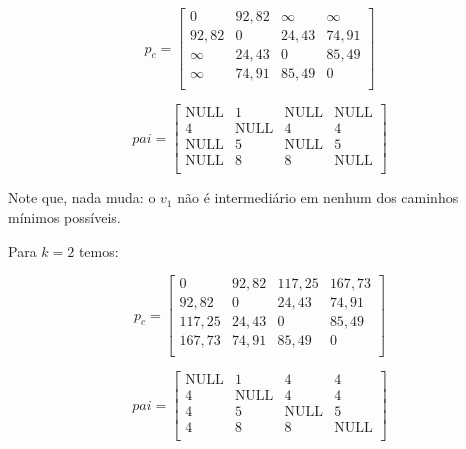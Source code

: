 \begin{equation}
	p_c = 
	\begin{bmatrix} \label{eq:matrizCustoFloydWarshall-2}
		0 & 92,82 & \infty & \infty \\%
		92,82 & 0 & 24,43 & 74,91 \\%
		\infty & 24,43 & 0 & 85,49 \\%
		\infty & 74,91 & 85,49 & 0 \\%
	\end{bmatrix}	
\end{equation}

\begin{equation}
	pai = 
	\begin{bmatrix} \label{eq:matrizAdjFloydWarshall-2}
		\text{NULL} & 1 & \text{NULL} & \text{NULL} \\%
		4 & \text{NULL} & 4 & 4 \\%
		\text{NULL} & 5 & \text{NULL} & 5 \\%
		\text{NULL} & 8 & 8 & \text{NULL} \\%
	\end{bmatrix}
\end{equation}

Note que, nada muda: o $ v_1 $ não é intermediário em nenhum dos caminhos mínimos possíveis.

Para $ k = 2 $ temos:

\begin{equation}
	p_c = 
	\begin{bmatrix} \label{eq:matrizCustoFloydWarshall-3}
		0 & 92,82 & 117,25 & 167,73 \\%
		92,82 & 0 & 24,43 & 74,91 \\%
		117,25 & 24,43 & 0 & 85,49 \\%
		167,73 & 74,91 & 85,49 & 0 \\%
	\end{bmatrix}	
\end{equation}

\begin{equation}
	pai = 
	\begin{bmatrix} \label{eq:matrizAdjFloydWarshall-3}
		\text{NULL} & 1 & 4 & 4 \\%
		4 & \text{NULL} & 4 & 4 \\%
		4 & 5 & \text{NULL} & 5 \\%
		4 & 8 & 8 & \text{NULL} \\%
	\end{bmatrix}
\end{equation}

